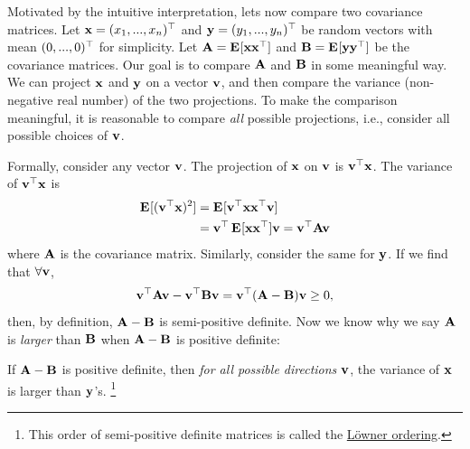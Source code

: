 \documentclass[a4paper]{article}
\begin{document}
\begin{multicols}{2}
Motivated by the intuitive interpretation, lets now compare two covariance matrices.
Let $\xx=(x_1,...,x_n)\T$ and $\yy=(y_1,...,y_n)\T$ be random vectors with mean $(0,...,0)\T$ for simplicity.
Let $\AA=\E{\xx\xx\T}$ and $\BB=\E{\yy\yy\T}$ be the covariance matrices.
Our goal is to compare $\AA$ and $\BB$ in some meaningful way.
We can project $\xx$ and $\yy$ on a vector $\vv$,
and then compare the variance (non-negative real number) of the two projections.
To make the comparison meaningful,
it is reasonable to compare \emph{all} possible projections,
i.e., consider all possible choices of $\vv$.

Formally, consider any vector $\vv$.
The projection of $\xx$ on $\vv$ is $\vv\T \xx$.
The variance of $\vv\T \xx$ is 
\begin{align*}
	\E{(\vv\T \xx)^2}
	&= \E{\vv\T \xx\xx\T\vv} \\
	&= \vv\T\E{\xx\xx\T}\vv
	= \vv\T \AA\vv
\end{align*}
where $\AA$ is the covariance matrix.
Similarly, consider the same for $\yy$.
If we find that $\forall\vv$,
\begin{align*}
	\vv\T \AA\vv - \vv\T \BB\vv
	= \vv\T (\AA - \BB)\vv
	\geq 0,
\end{align*}
then, by definition, $\AA-\BB$ is semi-positive definite.
Now we know why we say $\AA$ is \emph{larger} than $\BB$ when $\AA-\BB$ is positive definite:

\begin{tcolorbox}[enhanced,sharp corners,frame hidden,boxrule=0sp,borderline west={3pt}{0pt}{black!70}]
	If $\AA-\BB$ is positive definite,
	then \emph{for all possible directions $\vv$},
	the variance of $\xx$ is larger than $\yy$'s.
	\footnote{
	This order of semi-positive definite matrices is called the
	\href{https://en.wikipedia.org/wiki/Loewner_order}{L\"{o}wner ordering}.
	}
\end{tcolorbox}


\end{multicols}
\end{document}
